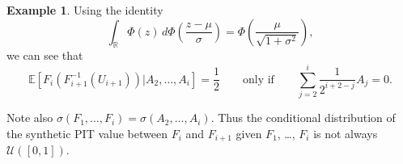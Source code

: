 \documentclass[aap]{imsart}
\theoremstyle{plain}
\theoremstyle{definition}
\newtheorem{example}[theorem]{Example}
\begin{document}
\begin{example}
Using the identity
\begin{equation}\label{normal_identity}
  \int_\mathbb{R} \Phi(z) \,d\Phi\left(\frac{z - \mu}{\sigma}\right) = \Phi\left(\frac{\mu}{\sqrt{1+\sigma^2}}\right),
\end{equation}
we can see that
\begin{equation*}
  \mathbb{E}[F_i(F_{i+1}^{-1}(U_{i+1}))|A_2, \ldots, A_i] = \frac{1}{2} \qquad \text{only if} \qquad \sum_{j=2}^i \frac{1}{2^{i+2-j}} A_j = 0.
\end{equation*}

Note also $\sigma(F_1, \ldots, F_i) = \sigma(A_2, \ldots, A_i)$. Thus the conditional distribution of the synthetic PIT value between $F_i$ and $F_{i+1}$ given $F_1$, \ldots, $F_i$ is not always $\mathcal{U}([0,1])$.
\end{example}
\end{document}

